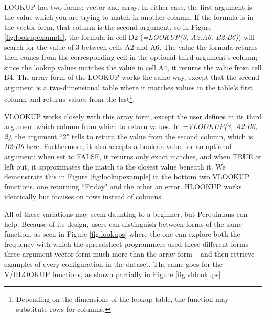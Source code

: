 \documentclass[conference]{IEEEtran}
\newcommand{\toolname}{Perquimans }
\begin{document}
	LOOKUP has two forms: vector and array. In either case, the first argument is
	the value which you are trying to match in another column. If the formula is in
	the vector form, that column is the second argument, so in Figure
	\ref{fig:lookupexample}, the formula in cell D2 (\textit{=LOOKUP(3, A2:A6,
		B2:B6)}) will search for the value of 3 between cells A2 and A6. The value the
	formula returns then comes from the corresponding cell in the optional third
	argument's column; since the lookup values matches the value in cell A4, it
	returns the value from cell B4. The array form of the LOOKUP works the same
	way, except that the second argument is a two-dimensional table where it
	matches values in the table's first column and returns values from the
	last\footnote{ Depending on the dimensions of the lookup table, the function
		may substitute rows for columns.}.
	
	VLOOKUP works closely with this array form, except the user defines in its
	third argument which column from which to return values. In \textit{=VLOOKUP(3,
		A2:B6, 2)}, the argument ``2" tells to return the value from the second column,
	which is \textit{B2:B6} here. Furthermore, it also accepts a boolean value for
	an optional argument: when set to FALSE, it returns only exact matches, and
	when TRUE or left out, it approximates the match to the closest value beneath
	it. We demonstrate this in Figure \ref{fig:lookupexample} in the bottom two
	VLOOKUP functions, one returning ``Friday" and the other an error. HLOOKUP
	works identically but focuses on rows instead of columns.
	
	All of these variations may seem daunting to a beginner, but \toolname can
	help. Because of its design, users can distinguish between forms of the same
	function, as seen in Figure \ref{fig:lookups} where the one can explore both
	the frequency with which the spreadsheet programmers used these different forms
	-- three-argument vector form much more than the array form -- and then
	retrieve examples of every configuration in the dataset. The same goes for the
	V/HLOOKUP functions, as shown partially in Figure \ref{fig:vhlookups}
	
\end{document}
